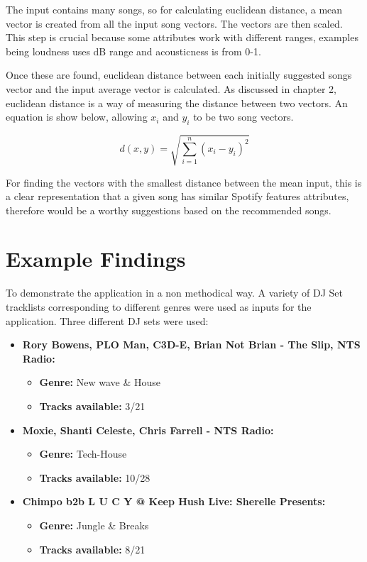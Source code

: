 The input contains many songs, so for calculating euclidean distance, a mean vector is created from all the input song vectors. The vectors are then scaled. This step is crucial because some attributes work with different ranges, examples being loudness uses dB range and acousticness is from 0-1.

Once these are found, euclidean distance between each initially suggested songs vector and the input average vector is calculated. As discussed in chapter 2, euclidean distance is a way of measuring the distance between two vectors. An equation is show below, allowing $x_{i}$ and $y_{i}$ to be two song vectors.

\begin{equation}
	d(x,y) = \sqrt{\sum _{i=1} ^{n}(x_{i} - y_{i})^{2}}
\end{equation}

For finding the vectors with the smallest distance between the mean input, this is a clear representation that a given song has similar Spotify features attributes, therefore would be a worthy suggestions based on the recommended songs.

\section{Example Findings}
To demonstrate the application in a non methodical way. A variety of DJ Set tracklists corresponding to different genres were used as inputs for the application.  Three different DJ sets were used:

\begin{itemize}
	\item \textbf{Rory Bowens, PLO Man, C3D-E, Brian Not Brian - The Slip, NTS Radio: } 
	\begin{itemize}
		\item \textbf{Genre:} New wave \& House
		\item \textbf{Tracks available:} 3/21
	\end{itemize}
	\item \textbf{Moxie, Shanti Celeste, Chris Farrell - NTS Radio: } 
	\begin{itemize}
		\item \textbf{Genre:} Tech-House
		\item \textbf{Tracks available:} 10/28
	\end{itemize}
	\item \textbf{Chimpo b2b L U C Y @ Keep Hush Live: Sherelle Presents:}
	\begin{itemize}
		\item \textbf{Genre:} Jungle \& Breaks
		\item \textbf{Tracks available:} 8/21
	\end{itemize}
	
\end{itemize}


